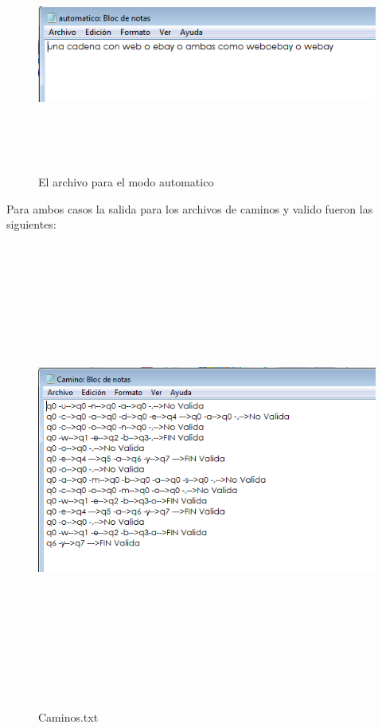 \documentclass[12pt]{article}
\begin{document}
\begin{figure}[H]
\includegraphics[width=15cm, height=7cm]{auto_web_archivo}
\label{fig:manual_afn}
\caption{El archivo para el modo automatico}
\end{figure}

Para ambos casos la salida para los archivos de caminos y valido fueron las siguientes:

\begin{figure}[H]
\includegraphics[width=\textwidth, height=15cm]{web_caminos}
\label{fig:manual_afn}
\caption{Caminos.txt}
\end{figure}
\end{document}
